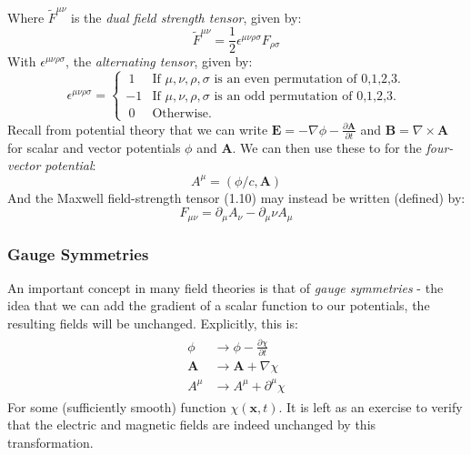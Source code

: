 \documentclass[a4paper]{article}
\numberwithin{equation}{section}
\begin{document}
Where $\tilde{F}^{\mu \nu}$ is the \textit{dual field strength tensor}, given by:
\begin{equation}
\tilde{F}^{\mu \nu} = \frac{1}{2} \epsilon^{\mu \nu \rho \sigma}F_{\rho \sigma}
\end{equation}
With $\epsilon^{\mu \nu \rho \sigma}$, the \textit{alternating tensor}, given by:
\begin{equation}
\epsilon^{\mu \nu \rho \sigma}=
\begin{cases}
\ 1 & \text{If $\mu,\nu,\rho,\sigma$ is an even permutation of 0,1,2,3.} \\
-1 & \text{If $\mu,\nu,\rho,\sigma$ is an odd permutation of 0,1,2,3.} \\
\ 0 & \text{Otherwise.}
\end{cases}
\end{equation}
Recall from potential theory that we can write $\mathbf{E}=-\nabla \phi - \frac{\partial \mathbf{A}}{\partial t}$ and $\mathbf{B} = \nabla \times \mathbf{A}$ for scalar and vector potentials $\phi$ and $\mathbf{A}$. We can then use these to for the \textit{four-vector potential}:
\begin{equation}
A^{\mu}=(\phi/c, \mathbf{A})
\end{equation}
And the Maxwell field-strength tensor (1.10) may instead be written (defined) by:
\begin{equation}
F_{\mu \nu} = \partial_\mu A_\nu - \partial_\mu\nu A_\mu
\end{equation}
\subsubsection{Gauge Symmetries}
An important concept in many field theories is that of \textit{gauge symmetries} - the idea that we can add the gradient of a scalar function to our potentials, the resulting fields will be unchanged. Explicitly, this is:
\begin{align}
\begin{split}
\phi &\rightarrow \phi - \frac{\partial \chi}{\partial t} \\
\mathbf{A} &\rightarrow \mathbf{A}+ \nabla \chi \\
A^\mu &\rightarrow A^\mu + \partial^\mu \chi
\end{split}
\end{align}
For some (sufficiently  smooth) function $\chi(\mathbf{x},t)$. It is left as an exercise to verify that the electric and magnetic fields are indeed unchanged by this transformation.
\end{document}
